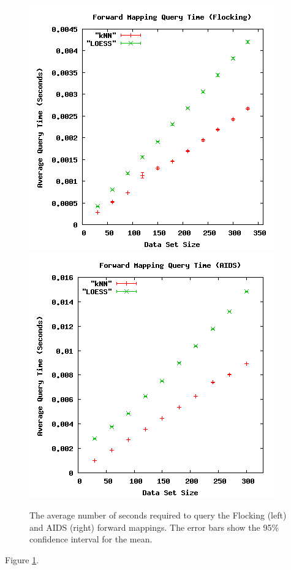 \begin{figure}[ht]
\centering
\includegraphics[scale=.4]{images/results_flocking/fmquery.png}
\includegraphics[scale=.4]{images/results_aids/aids-fmquery.png}
\caption{The average number of seconds required to query the Flocking (left) and AIDS (right) forward mappings.
The error bars show the 95\% confidence interval for the mean.}
\label{fig:fmquery}
\end{figure}

Figure \ref{fig:fmquery}.



